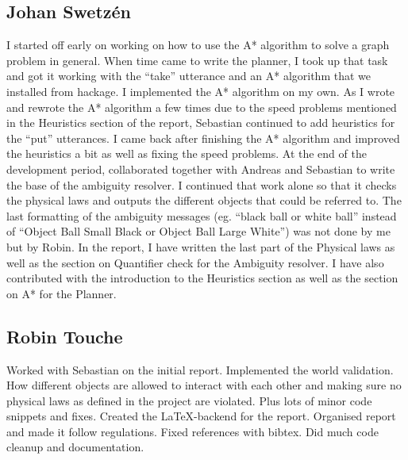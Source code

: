 \subsection*{Johan Swetz\'en}
I started off early on working on how to use the A* algorithm to solve a graph problem in general.
When time came to write the planner, I took up that task and got it working with the ``take'' utterance and an A* algorithm that we installed from hackage.
\newline
\newline
I implemented the A* algorithm on my own.
As I wrote and rewrote the A* algorithm a few times due to the speed problems mentioned in the Heuristics section of the report, Sebastian continued to add heuristics for the ``put'' utterances. I came back after finishing the A* algorithm and improved the heuristics a bit as well as fixing the speed problems.
\newline
\newline
At the end of the development period, collaborated together with Andreas and Sebastian to write the base of the ambiguity resolver.
I continued that work alone so that it checks the physical laws and outputs the different objects that could be referred to.
The last formatting of the ambiguity messages (eg. ``black ball or white ball'' instead of ``Object Ball Small Black or Object Ball Large White'') was not done by me but by Robin.
\newline
\newline
In the report, I have written the last part of the Physical laws as well as the section on Quantifier check for the Ambiguity resolver.
I have also contributed with the introduction to the Heuristics section as well as the section on A* for the Planner.

\subsection*{Robin Touche}
Worked with Sebastian on the initial report.
\newline
\newline
Implemented the world validation.
How different objects are allowed to interact with each other and making sure no physical laws as defined in the project are violated.
Plus lots of minor code snippets and fixes.
\newline
\newline
Created the \LaTeX-backend for the report.
Organised report and made it follow regulations.
Fixed references with bibtex.
\newline
\newline
Did much code cleanup and documentation.
